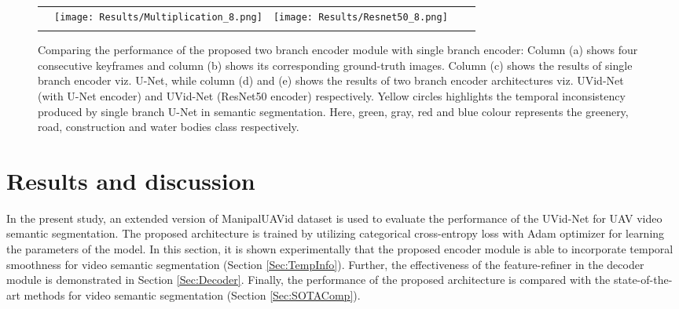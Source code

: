 \documentclass[journal]{IEEEtran}
\begin{document}
\begin{figure*}[!t]
\begin{tabular}{ccccc}
		&
		\hspace{1.4cm}
		\begin{minipage}{40pt}
			\texttt{[image: Results/Multiplication\_8.png]}
			\centering{(d)}
		\end{minipage}
		&
		\hspace{1.4cm}
		\begin{minipage}{40pt}
			\texttt{[image: Results/Resnet50\_8.png]}
			\centering{(e)}
		\end{minipage}
		\\
		\\
		
	\end{tabular}
	\caption{Comparing the performance of the proposed two branch encoder module with single branch encoder: Column (a) shows four consecutive keyframes and column (b) shows its corresponding ground-truth images. Column (c) shows the results of single branch encoder viz. U-Net, while column (d) and (e) shows the results of two branch encoder architectures viz. UVid-Net (with U-Net encoder) and UVid-Net (ResNet50 encoder) respectively. Yellow circles highlights the temporal inconsistency produced by single branch U-Net in semantic segmentation.  Here, green, gray, red and blue  colour represents the greenery, road, construction and water bodies class respectively. }
	\label{fig:temporal}
	
\end{figure*}




\section{Results and discussion}
\label{Sec: results}




\par In the present study, an extended version of ManipalUAVid \cite{19} dataset is used to evaluate the performance of the UVid-Net for UAV video semantic segmentation. The proposed architecture is trained by utilizing categorical cross-entropy loss with Adam optimizer for learning the parameters of the model.  In this section, it is shown experimentally that the proposed encoder module is able to incorporate temporal smoothness for video semantic segmentation (Section \ref{Sec:TempInfo}). Further, the effectiveness of the feature-refiner in the decoder module is demonstrated in Section \ref{Sec:Decoder}. Finally, the performance of the proposed architecture is compared with the state-of-the-art methods for video semantic segmentation (Section \ref{Sec:SOTAComp}). 
\end{document}
